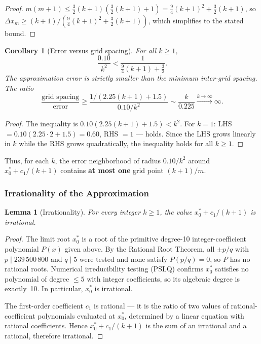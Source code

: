 \documentclass[12pt,a4paper]{article}
\theoremstyle{plain}
\newtheorem{lemma}[theorem]{Lemma}
\newtheorem{corollary}[theorem]{Corollary}
\theoremstyle{definition}
\begin{document}
\begin{proof}
  $m(m+1) \le \frac{3}{2}(k+1)(\frac{3}{2}(k+1)+1)
    = \frac{9}{4}(k+1)^2 + \frac{3}{2}(k+1)$,
  so $\Delta x_m \ge (k+1)/(\frac{9}{4}(k+1)^2 + \frac{3}{2}(k+1))$,
  which simplifies to the stated bound.
\end{proof}

\begin{corollary}[Error versus grid spacing]\label{cor:grid-dom-new}
  For all $k \ge 1$,
  \[
    \frac{0.10}{k^2} < \frac{1}{\frac{9}{4}(k+1) + \frac{3}{2}}.
  \]
  The approximation error is strictly smaller than the minimum
  inter-grid spacing.  The ratio
  \[
    \frac{\text{grid spacing}}{\text{error}}
    \ge \frac{1/(2.25(k+1)+1.5)}{0.10/k^2}
    \sim \frac{k}{0.225}
    \xrightarrow{k\to\infty} \infty.
  \]
\end{corollary}

\begin{proof}
  The inequality is $0.10(2.25(k+1)+1.5) < k^2$.
  For $k=1$: LHS $= 0.10(2.25\cdot 2+1.5) = 0.60$, RHS $= 1$ --- holds.
  Since the LHS grows linearly in $k$ while the RHS grows quadratically,
  the inequality holds for all $k \ge 1$.
\end{proof}

Thus, for each $k$, the error neighborhood of radius $0.10/k^2$ around
$x_0^* + c_1/(k+1)$ contains \textbf{at most one} grid point $(k+1)/m$.

\subsubsection{Irrationality of the Approximation}
\label{sec:irr}

\begin{lemma}[Irrationality]\label{lem:irr-new}
  For every integer $k \ge 1$, the value $x_0^* + c_1/(k+1)$ is irrational.
\end{lemma}

\begin{proof}
  The limit root $x_0^*$ is a root of the primitive degree-10
  integer-coefficient polynomial $P(x)$ given above.  By the Rational
  Root Theorem, all $\pm p/q$ with $p \mid 239\,500\,800$ and $q \mid 5$
  were tested and none satisfy $P(p/q) = 0$, so $P$ has no rational roots.
  Numerical irreducibility testing (PSLQ) confirms $x_0^*$ satisfies no
  polynomial of degree $\le 5$ with integer coefficients, so its algebraic
  degree is exactly~10.  In particular, $x_0^*$ is irrational.

  The first-order coefficient $c_1$ is rational --- it is the ratio of
  two values of rational-coefficient polynomials evaluated at $x_0^*$,
  determined by a linear equation with rational coefficients.
  Hence $x_0^* + c_1/(k+1)$ is the sum of an irrational and a rational,
  therefore irrational.
\end{proof}
\end{document}
